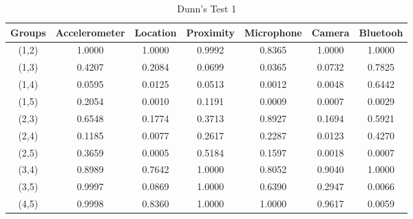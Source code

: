 \begin{table}[h!]
  \centering
  \caption{Dunn's Test 1}
  \label{tab:dunn_sensors}
  \begin{tabular}{ccccccc}
    \toprule
     Groups & Accelerometer & Location & Proximity & Microphone & Camera & Bluetooh \\
    \midrule
    (1,2) & 1.0000 & 1.0000 & 0.9992 & 0.8365 & 1.0000 & 1.0000 \\
    (1,3) & 0.4207 & 0.2084 & 0.0699 & 0.0365 & 0.0732 & 0.7825 \\
    (1,4) & 0.0595 & 0.0125 & 0.0513 & 0.0012 & 0.0048 & 0.6442 \\
    (1,5) & 0.2054 & 0.0010 & 0.1191 & 0.0009 & 0.0007 & 0.0029 \\
    (2,3) & 0.6548 & 0.1774 & 0.3713 & 0.8927 & 0.1694 & 0.5921 \\
    (2,4) & 0.1185 & 0.0077 & 0.2617 & 0.2287 & 0.0123 & 0.4270 \\
    (2,5) & 0.3659 & 0.0005 & 0.5184 & 0.1597 & 0.0018 & 0.0007 \\
    (3,4) & 0.8989 & 0.7642 & 1.0000 & 0.8052 & 0.9040 & 1.0000 \\
    (3,5) & 0.9997 & 0.0869 & 1.0000 & 0.6390 & 0.2947 & 0.0066 \\
    (4,5) & 0.9998 & 0.8360 & 1.0000 & 1.0000 & 0.9617 & 0.0059 \\
    \bottomrule
  \end{tabular}
\end{table} 

